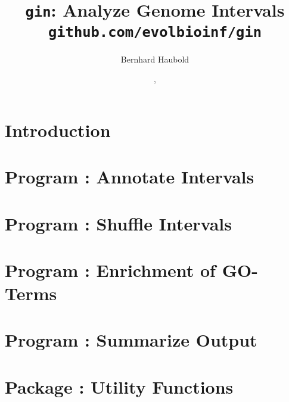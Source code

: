 \documentclass[a4paper]{report}
\begin{document}
\pagestyle{noweb}

\title{\texttt{gin}: Analyze Genome Intervals\\
\small\texttt{github.com/evolbioinf/gin}}
\author{Bernhard Haubold}
\date{\!\!, }
\maketitle
\tableofcontents

\chapter{Introduction}

\chapter{Program : Annotate Intervals}\label{ch:an}

\chapter{Program : Shuffle Intervals}\label{ch:sh}

\chapter{Program : Enrichment of GO-Terms}\label{ch:eg}

\chapter{Program : Summarize  Output}\label{ch:su}

\chapter{Package : Utility Functions}\label{ch:ut}


\end{document}
